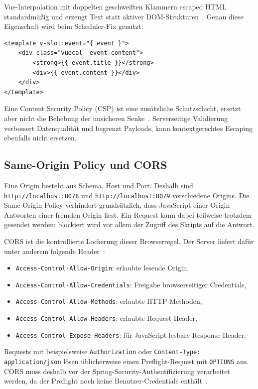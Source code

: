 Vue-Interpolation mit doppelten geschweiften Klammern escaped HTML
standardmäßig und erzeugt Text statt aktiver
DOM-Strukturen~\cite{vueSecurity}. Genau diese Eigenschaft wird beim
Scheduler-Fix genutzt:

\begin{lstlisting}[caption={Sichere Ausgabe eines Kalenderereignisses}]
<template v-slot:event="{ event }">
    <div class="vuecal__event-content">
        <strong>{{ event.title }}</strong>
        <div>{{ event.content }}</div>
    </div>
</template>
\end{lstlisting}

Eine Content Security Policy (CSP) ist eine zusätzliche
Schutzschicht, ersetzt aber nicht die Behebung der unsicheren
Senke~\cite{owaspCsp}. Serverseitige Validierung verbessert
Datenqualität und begrenzt Payloads, kann kontextgerechtes Escaping
ebenfalls nicht ersetzen.

\subsection{Same-Origin Policy und CORS}

Eine Origin besteht aus Schema, Host und Port. Deshalb sind
\texttt{http://localhost:8078} und \texttt{http://localhost:8079}
verschiedene Origins. Die Same-Origin Policy verhindert
grundsätzlich, dass JavaScript einer Origin Antworten einer fremden
Origin liest. Ein Request kann dabei teilweise trotzdem gesendet
werden; blockiert wird vor allem der Zugriff des Skripts auf die Antwort.

CORS ist die kontrollierte Lockerung dieser Browserregel. Der Server
liefert dafür unter anderem folgende Header~\cite{mdnCors}:

\begin{itemize}
  \item \texttt{Access-Control-Allow-Origin}: erlaubte lesende Origin,
  \item \texttt{Access-Control-Allow-Credentials}: Freigabe
    browserseitiger Credentials,
  \item \texttt{Access-Control-Allow-Methods}: erlaubte HTTP-Methoden,
  \item \texttt{Access-Control-Allow-Headers}: erlaubte Request-Header,
  \item \texttt{Access-Control-Expose-Headers}: für JavaScript
    lesbare Response-Header.
\end{itemize}

Requests mit beispielsweise \texttt{Authorization} oder
\texttt{Content-Type: application/json} lösen üblicherweise einen
Preflight-Request mit \texttt{OPTIONS} aus. CORS muss deshalb vor der
Spring-Security-Authentifizierung verarbeitet werden, da der
Preflight noch keine Benutzer-Credentials enthält~\cite{springCors}.

